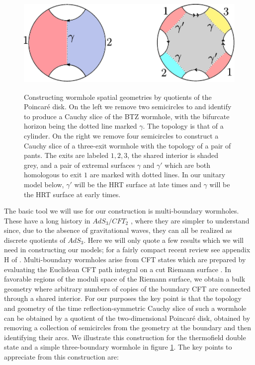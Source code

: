 \documentclass[12pt]{article}
\newcommand{\bfig}{\begin{figure}\begin{center}}
\newcommand{\efig}{\end{center}\end{figure}}
\theoremstyle{definition}
\begin{document}
\bfig
\includegraphics[height=5cm]{tfd.pdf}
\caption{Constructing wormhole spatial geometries by quotients of the Poincar\'e disk.  On the left we remove two semicircles to and identify to produce a Cauchy slice of the BTZ wormhole, with the bifurcate horizon being the dotted line marked $\gamma$.  The topology is that of a cylinder.  On the right we remove four semicircles to construct a Cauchy slice of a three-exit wormhole with the topology of a pair of pants.  The exits are labeled $1,2,3$, the shared interior is shaded grey, and a pair of extremal surfaces $\gamma$ and $\gamma'$ which are both homologous to exit $1$ are marked with dotted lines.  In our unitary model below, $\gamma'$ will be the HRT surface at late times and $\gamma$ will be the HRT surface at early times.}\label{wormholefig}
\efig
The basic tool we will use for our construction is multi-boundary wormholes.  These have a long history in $AdS_3/CFT_2$ \cite{Krasnov:2000zq,Skenderis:2009ju,Balasubramanian:2014hda}, where they are simpler to understand since, due to the absence of gravitational waves, they can all be realized as discrete quotients of $AdS_3$.  Here we will only quote a few results which we will need in constructing our models; for a fairly compact recent review see appendix H of \cite{Harlow:2018tng}.  Multi-boundary wormholes arise from CFT states which are prepared by evaluating the Euclidean CFT path integral on a cut Riemann surface \cite{Krasnov:2000zq}.  In favorable regions of the moduli space of the Riemann surface, we obtain a bulk geometry where arbitrary numbers of copies of the boundary CFT are connected through a shared interior.  For our purposes the key point is that the topology and geometry of the time reflection-symmetric Cauchy slice of such a wormhole can be obtained by a quotient of the two-dimensional Poincar\'e disk, obtained by removing a collection of semicircles from the geometry at the boundary and then identifying their arcs.  We illustrate this construction for the thermofield double state and a simple three-boundary wormhole in figure \ref{wormholefig}.  The key points to appreciate from this construction are:
\end{document}
